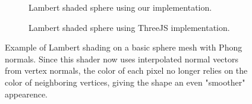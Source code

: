 \documentclass[10pt,twocolumn,letterpaper]{article}
\begin{document}
\begin{figure}
    \centering
    \begin{subfigure}{.48\linewidth}
        \caption{Lambert shaded sphere using our implementation.}
        \label{fig:our-lambert-sphere}
    \end{subfigure}
    \hfill
    \begin{subfigure}{.48\linewidth}
        \caption{Lambert shaded sphere using ThreeJS implementation.}
        \label{fig:three-lambert-sphere}
    \end{subfigure}
    \caption{Example of Lambert shading on a basic sphere mesh with Phong normals. Since this shader now uses interpolated normal vectors from vertex normals, the color of each pixel no longer relies on the color of neighboring vertices, giving the shape an even "smoother" appearence.}
    \label{fig:lambert-sphere}
\end{figure}
\end{document}
